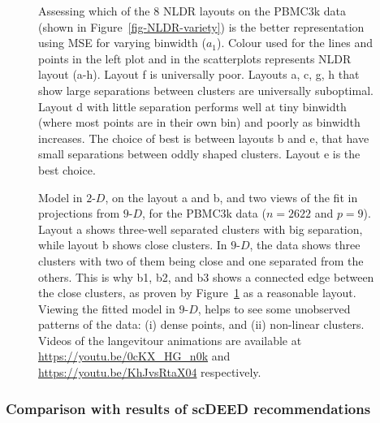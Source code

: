 \documentclass[
  12pt]{article}
\newcommand\gD{$2\text{-}D$}
\begin{document}
\begin{figure}[H]


\caption{\label{fig-pbmc-mse}Assessing which of the 8 NLDR layouts on
the PBMC3k data (shown in Figure~\ref{fig-NLDR-variety}) is the better
representation using MSE for varying binwidth (\(a_1\)). Colour used for
the lines and points in the left plot and in the scatterplots represents
NLDR layout (a-h). Layout f is universally poor. Layouts a, c, g, h that
show large separations between clusters are universally suboptimal.
Layout d with little separation performs well at tiny binwidth (where
most points are in their own bin) and poorly as binwidth increases. The
choice of best is between layouts b and e, that have small separations
between oddly shaped clusters. Layout e is the best choice.}

\end{figure}%

\begin{figure}[H]


\caption{\label{fig-model-pbmc-author-proj}Model in \gD{}, on the layout
a and b, and two views of the fit in projections from \(9\text{-}D\),
for the PBMC3k data (\(n =  2622\) and \(p = 9\)). Layout a shows
three-well separated clusters with big separation, while layout b shows
close clusters. In \(9\text{-}D\), the data shows three clusters with
two of them being close and one separated from the others. This is why
b1, b2, and b3 shows a connected edge between the close clusters, as
proven by Figure~\ref{fig-pbmc-mse} as a reasonable layout. Viewing the
fitted model in \(9\text{-}D\), helps to see some unobserved patterns of
the data: (i) dense points, and (ii) non-linear clusters. Videos of the
langevitour animations are available at
\url{https://youtu.be/0cKX_HG_n0k} and
\url{https://youtu.be/KhJvsRtaX04} respectively.}

\end{figure}%

\subsubsection{Comparison with results of scDEED
recommendations}\label{comparison-with-results-of-scdeed-recommendations}
\end{document}
